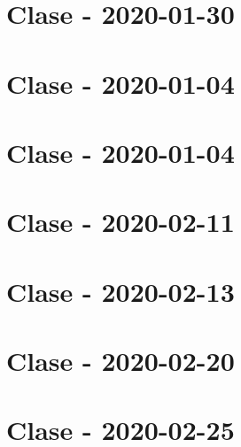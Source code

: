 \documentclass{book}
\begin{document}
\chapter{Clase - 2020-01-30}


\chapter{Clase - 2020-01-04}


\chapter{Clase - 2020-01-04}


\chapter{Clase - 2020-02-11}


\chapter{Clase - 2020-02-13}


\chapter{Clase - 2020-02-20}


\chapter{Clase - 2020-02-25}

\end{document}
